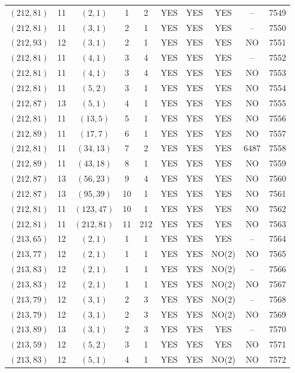 \begin{longtable}{|c|c|c|c|c|c|c|c|c|c|}
$(212, 81)$ & 11 & $(2, 1)$ & 1 & 2 & YES & YES & YES & -- & 7549\\
$(212, 81)$ & 11 & $(3, 1)$ & 2 & 1 & YES & YES & YES & -- & 7550\\
$(212, 93)$ & 12 & $(3, 1)$ & 2 & 1 & YES & YES & YES & NO & 7551\\
$(212, 81)$ & 11 & $(4, 1)$ & 3 & 4 & YES & YES & YES & -- & 7552\\
$(212, 81)$ & 11 & $(4, 1)$ & 3 & 4 & YES & YES & YES & NO & 7553\\
$(212, 81)$ & 11 & $(5, 2)$ & 3 & 1 & YES & YES & YES & NO & 7554\\
$(212, 87)$ & 13 & $(5, 1)$ & 4 & 1 & YES & YES & YES & NO & 7555\\
$(212, 81)$ & 11 & $(13, 5)$ & 5 & 1 & YES & YES & YES & NO & 7556\\
$(212, 89)$ & 11 & $(17, 7)$ & 6 & 1 & YES & YES & YES & NO & 7557\\
$(212, 81)$ & 11 & $(34, 13)$ & 7 & 2 & YES & YES & YES & 6487 & 7558\\
$(212, 89)$ & 11 & $(43, 18)$ & 8 & 1 & YES & YES & YES & NO & 7559\\
$(212, 87)$ & 13 & $(56, 23)$ & 9 & 4 & YES & YES & YES & NO & 7560\\
$(212, 87)$ & 13 & $(95, 39)$ & 10 & 1 & YES & YES & YES & NO & 7561\\
$(212, 81)$ & 11 & $(123, 47)$ & 10 & 1 & YES & YES & YES & NO & 7562\\
$(212, 81)$ & 11 & $(212, 81)$ & 11 & 212 & YES & YES & YES & NO & 7563\\
$(213, 65)$ & 12 & $(2, 1)$ & 1 & 1 & YES & YES & YES & -- & 7564\\
$(213, 77)$ & 12 & $(2, 1)$ & 1 & 1 & YES & YES & NO(2) & NO & 7565\\
$(213, 83)$ & 12 & $(2, 1)$ & 1 & 1 & YES & YES & NO(2) & -- & 7566\\
$(213, 83)$ & 12 & $(2, 1)$ & 1 & 1 & YES & YES & NO(2) & NO & 7567\\
$(213, 79)$ & 12 & $(3, 1)$ & 2 & 3 & YES & YES & NO(2) & -- & 7568\\
$(213, 79)$ & 12 & $(3, 1)$ & 2 & 3 & YES & YES & NO(2) & NO & 7569\\
$(213, 89)$ & 13 & $(3, 1)$ & 2 & 3 & YES & YES & YES & -- & 7570\\
$(213, 59)$ & 12 & $(5, 2)$ & 3 & 1 & YES & YES & YES & NO & 7571\\
$(213, 83)$ & 12 & $(5, 1)$ & 4 & 1 & YES & YES & NO(2) & NO & 7572\\

\end{longtable}
